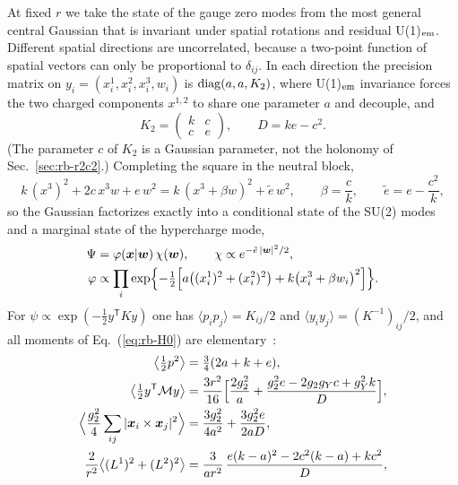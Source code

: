 At fixed $r$ we take the state of the gauge zero modes from the most general central Gaussian that is invariant under spatial rotations and residual U(1)$_{\rm em}$.
Different spatial directions are uncorrelated, because a two-point function of spatial vectors can only be proportional to $\delta_{ij}$.
In each direction the precision matrix on $y_i=(x_i^1,x_i^2,x_i^3,w_i)$ is ${\rm diag}(a,a,K_2)$, where U(1)$_{\rm em}$ invariance forces the two charged components $x^{1,2}$ to share one parameter $a$ and decouple, and
\begin{equation}
K_2=\begin{pmatrix}k&c\\ c&e\end{pmatrix},\qquad D=ke-c^2 .
\label{eq:rb-K2}
\end{equation}
(The parameter $c$ of $K_2$ is a Gaussian parameter, not the holonomy of Sec.~\ref{sec:rb-r2c2}.)
Completing the square in the neutral block,
\begin{equation}
k\,(x^3)^2+2c\,x^3w+e\,w^2=k\,(x^3+\beta w)^2+\tilde e\,w^2,\qquad \beta=\frac ck,\qquad \tilde e=e-\frac{c^2}{k},
\label{eq:rb-square}
\end{equation}
so the Gaussian factorizes exactly into a conditional state of the SU(2) modes and a marginal state of the hypercharge mode,
\begin{align}
\Psi&=\varphi(\bm x|\bm w)\,\chi(\bm w),\qquad \chi\propto e^{-\tilde e\,|\bm w|^2/2},\nonumber\\
\varphi&\propto \prod_i \exp\Bigl\{-\tfrac12\Bigl[a\bigl((x_i^1)^2+(x_i^2)^2\bigr)+k\bigl(x_i^3+\beta w_i\bigr)^2\Bigr]\Bigr\}.
\label{eq:rb-condGauss}
\end{align}
For $\psi\propto\exp(-\frac12y^{\mathsf T}Ky)$ one has $\langle p_ip_j\rangle=K_{ij}/2$ and $\langle y_iy_j\rangle=(K^{-1})_{ij}/2$, and all moments of Eq.~(\ref{eq:rb-H0}) are elementary~\cite{Luscher:1982ma,vanBaal:2000zc}:
\begin{align}
\bigl\langle\tfrac12p^2\bigr\rangle&=\tfrac34(2a+k+e),\nonumber\\
\bigl\langle\tfrac12y^{\mathsf T}\mathcal My\bigr\rangle&=\frac{3r^2}{16}\Bigl[\frac{2g_2^2}{a}+\frac{g_2^2e-2g_2g_Yc+g_Y^2k}{D}\Bigr],\nonumber\\
\Bigl\langle\frac{g_2^2}{4}\sum_{ij}|\bm x_i\times\bm x_j|^2\Bigr\rangle&=\frac{3g_2^2}{4a^2}+\frac{3g_2^2e}{2aD},\nonumber\\
\frac{2}{r^2}\bigl\langle(L^1)^2+(L^2)^2\bigr\rangle&=\frac{3}{ar^2}\,\frac{e(k-a)^2-2c^2(k-a)+kc^2}{D},
\label{eq:rb-moments}
\end{align}

